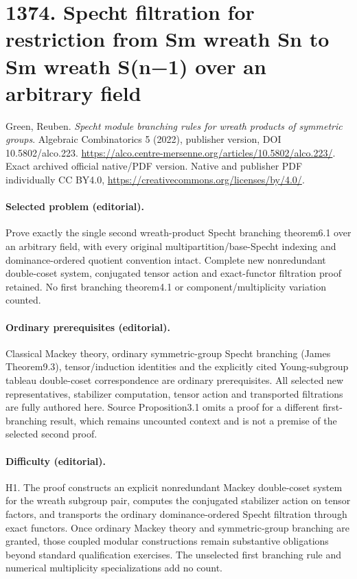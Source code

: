 \documentclass[10pt]{article}
\theoremstyle{definition}
\begin{document}
\section*{1374. Specht filtration for restriction from Sm wreath Sn to Sm wreath S(n−1) over an arbitrary field}
Green, Reuben. \emph{Specht module branching rules for wreath products of symmetric groups}. Algebraic Combinatorics 5 (2022), publisher version, DOI 10.5802/alco.223. \url{https://alco.centre-mersenne.org/articles/10.5802/alco.223/}. Exact archived official native/PDF version. Native and publisher PDF individually CC BY4.0, \url{https://creativecommons.org/licenses/by/4.0/}.
\paragraph{Selected problem (editorial).} Prove exactly the single second wreath-product Specht branching theorem6.1 over an arbitrary field, with every original multipartition/base-Specht indexing and dominance-ordered quotient convention intact. Complete new nonredundant double-coset system, conjugated tensor action and exact-functor filtration proof retained. No first branching theorem4.1 or component/multiplicity variation counted.
\paragraph{Ordinary prerequisites (editorial).} Classical Mackey theory, ordinary symmetric-group Specht branching (James Theorem9.3), tensor/induction identities and the explicitly cited Young-subgroup tableau double-coset correspondence are ordinary prerequisites. All selected new representatives, stabilizer computation, tensor action and transported filtrations are fully authored here. Source Proposition3.1 omits a proof for a different first-branching result, which remains uncounted context and is not a premise of the selected second proof.
\paragraph{Difficulty (editorial).} H1. The proof constructs an explicit nonredundant Mackey double-coset system for the wreath subgroup pair, computes the conjugated stabilizer action on tensor factors, and transports the ordinary dominance-ordered Specht filtration through exact functors. Once ordinary Mackey theory and symmetric-group branching are granted, those coupled modular constructions remain substantive obligations beyond standard qualification exercises. The unselected first branching rule and numerical multiplicity specializations add no count.
\end{document}
